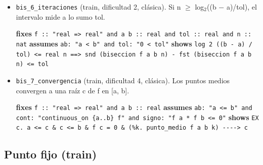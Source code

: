 \documentclass[11pt,a4paper]{article}
\begin{document}
\begin{itemize}
  \item \texttt{bis\_\allowbreak{}6\_\allowbreak{}iteraciones} (train, dificultad 2, clásica). Si n $\ge $ log$_{2}$((b $-$ a)/tol), el intervalo mide a lo sumo tol.\\
  {\footnotesize \textbf{fixes} \texttt{f :\allowbreak{}:\allowbreak{} "real =\allowbreak{}> real" and a b :\allowbreak{}:\allowbreak{} real and tol :\allowbreak{}:\allowbreak{} real and n :\allowbreak{}:\allowbreak{} nat} \textbf{assumes} \texttt{ab:\allowbreak{} "a < b" and tol:\allowbreak{} "0 < tol"} \textbf{shows} \texttt{log 2 (\allowbreak{}(\allowbreak{}b -\allowbreak{} a) /\allowbreak{} tol) <=\allowbreak{} real n =\allowbreak{}=\allowbreak{}> snd (\allowbreak{}biseccion f a b n) -\allowbreak{} fst (\allowbreak{}biseccion f a b n) <=\allowbreak{} tol}\par}
  \item \texttt{bis\_\allowbreak{}7\_\allowbreak{}convergencia} (train, dificultad 4, clásica). Los puntos medios convergen a una raíz c de f en [a, b].\\
  {\footnotesize \textbf{fixes} \texttt{f :\allowbreak{}:\allowbreak{} "real =\allowbreak{}> real" and a b :\allowbreak{}:\allowbreak{} real} \textbf{assumes} \texttt{ab:\allowbreak{} "a <=\allowbreak{} b" and cont:\allowbreak{} "continuous\_\allowbreak{}on \{a..b\} f" and signo:\allowbreak{} "f a *\allowbreak{} f b <=\allowbreak{} 0"} \textbf{shows} \texttt{EX c. a <=\allowbreak{} c \&\allowbreak{} c <=\allowbreak{} b \&\allowbreak{} f c =\allowbreak{} 0 \&\allowbreak{} (\allowbreak{}\%k. punto\_\allowbreak{}medio f a b k) -\allowbreak{}{}-\allowbreak{}{}-\allowbreak{}{}-\allowbreak{}{}> c}\par}
\end{itemize}

\subsection{Punto fijo (train)}
\end{document}
